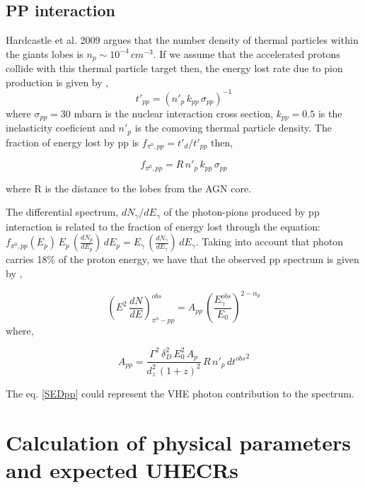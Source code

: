 \documentclass[preprint, twocolumn,secnumarabic,amssymb, nobibnotes, aps, prd]{revtex4-1}
\newcommand{\be}{\begin{equation}}
\newcommand{\ee}{\end{equation}}
\begin{document}
\subsection{PP interaction}

Hardcastle et al. 2009 argues that the number density of thermal particles within the giants lobes is $n_p\sim 10^{-4}\,cm^{-3}$. If we assume that  the accelerated protons collide with this thermal particle target then, the energy lost rate due to pion production is given by \citep{ato03},
\begin{equation}
t'_{pp}=(n'_p\,k_{pp}\,\sigma_{pp})^{-1}
\end{equation}
\noindent where $\sigma_{pp}=30$ mbarn is the nuclear interaction cross section, $k_{pp}=0.5$ is the inelasticity coeficient and $n'_p$ is the comoving thermal particle density.  The fraction of energy lost by pp is  $f_{\pi^0,pp}=t'_d/t'_{pp}$ then,


\begin{equation}
f_{\pi^0 ,pp}=R\,n'_p\,k_{pp}\,\sigma_{pp}
\end{equation}

\noindent where R is the distance to the lobes from the AGN core.

The differential spectrum, $dN_\gamma/dE_\gamma$ of the photon-pions produced by  pp interaction  is related to the fraction of energy lost through the
equation:  $f_{\pi^0 , pp}(E_p)\,E_p\,(\frac{dN_p}{dE_p})\,dE_p=E_\gamma\,(\frac{dN_\gamma}{dE_\gamma})\,dE_\gamma$. Taking into account that  photon carries 18$\%$ of the proton energy,  we have that the observed pp spectrum is given by \citep{gup08},

\begin{equation}
\label{pp}
\left(E^{2}\, \frac{dN}{dE}\right)^{obs}_{\pi^0 - pp}= A_{pp}\, \left(\frac{E^{obs}_{\gamma}}{E_{0}}\right)^{2-\alpha_p}
\end{equation}
where,


\be
A_{pp}= \frac{\Gamma^2\,\delta_D^2\,E_0^2\,A_p}{d_z^2\,(1+z)^2}\, R\,n'_p\,{dt^{obs}}^2
\ee

The eq.  \ref{SEDpp} could represent the VHE photon contribution  to the spectrum. 


\section{Calculation of physical parameters and expected UHECRs}
\end{document}
